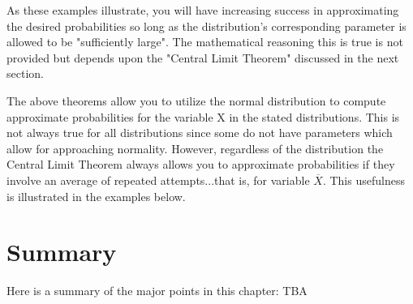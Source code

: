\documentclass[10pt,]{book}
\numberwithin{equation}{section}
\begin{document}
\hypertarget{p-1310}{}%
As these examples illustrate, you will have increasing success in approximating the desired probabilities so long as the distribution's corresponding parameter is allowed to be "sufficiently large". The mathematical reasoning this is true is not provided but depends upon the "Central Limit Theorem" discussed in the next section.%
\par
\hypertarget{p-1311}{}%
The above theorems allow you to utilize the normal distribution to compute approximate probabilities for the variable X in the stated distributions. This is not always true for all distributions since some do not have parameters which allow for approaching normality. However, regardless of the distribution the Central Limit Theorem always allows you to approximate probabilities if they involve an average of repeated attempts...that is, for variable \(\overline{X}\). This usefulness is illustrated in the examples below.%
%
%
\typeout{************************************************}
\typeout{************************************************}
%
\section[{Summary}]{Summary}\label{section-63}
\hypertarget{p-1312}{}%
Here is a summary of the major points in this chapter:%
\hypertarget{p-1313}{}%
TBA%
%
%
\typeout{************************************************}
\typeout{************************************************}
%
\end{document}
